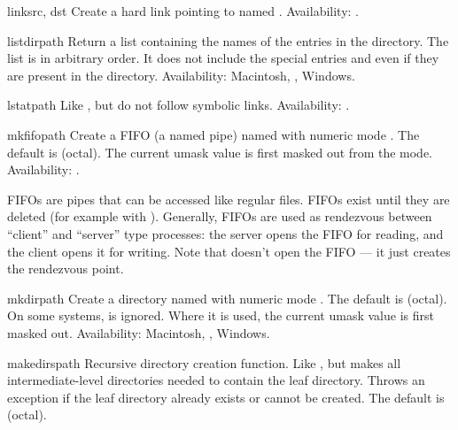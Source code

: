 \begin{funcdesc}{link}{src, dst}
Create a hard link pointing to  named .
Availability: \UNIX{}.
\end{funcdesc}

\begin{funcdesc}{listdir}{path}
Return a list containing the names of the entries in the directory.
The list is in arbitrary order.  It does not include the special
entries  and  even if they are present in the
directory.
Availability: Macintosh, \UNIX{}, Windows.
\end{funcdesc}

\begin{funcdesc}{lstat}{path}
Like , but do not follow symbolic links.
Availability: \UNIX{}.
\end{funcdesc}

\begin{funcdesc}{mkfifo}{path}
Create a FIFO (a named pipe) named  with numeric mode
.  The default  is  (octal).  The current
umask value is first masked out from the mode.
Availability: \UNIX{}.

FIFOs are pipes that can be accessed like regular files.  FIFOs exist
until they are deleted (for example with ).
Generally, FIFOs are used as rendezvous between ``client'' and
``server'' type processes: the server opens the FIFO for reading, and
the client opens it for writing.  Note that 
doesn't open the FIFO --- it just creates the rendezvous point.
\end{funcdesc}

\begin{funcdesc}{mkdir}{path}
Create a directory named  with numeric mode .
The default  is  (octal).  On some systems,
 is ignored.  Where it is used, the current umask value is
first masked out.
Availability: Macintosh, \UNIX{}, Windows.
\end{funcdesc}

\begin{funcdesc}{makedirs}{path}
Recursive directory creation function.  Like ,
but makes all intermediate-level directories needed to contain the
leaf directory.  Throws an  exception if the leaf
directory already exists or cannot be created.  The default 
is  (octal).
\end{funcdesc}


